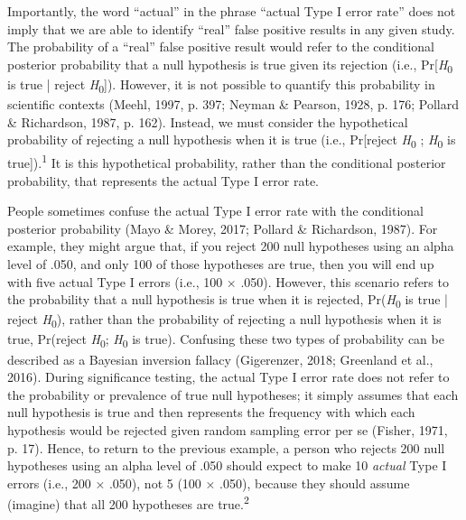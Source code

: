 \documentclass[authordate, empirical]{jote-new-article}
\begin{document}
	Importantly, the word “actual” in the phrase “actual Type I error rate” does not imply that we are able to identify “real” false positive results in any given study. The probability of a “real” false positive result would refer to the conditional posterior probability that a null hypothesis is true given its rejection (i.e., Pr[\emph{H}\textsubscript{0} is true | reject \emph{H}\textsubscript{0}]). However, it is not possible to quantify this probability in scientific contexts (Meehl, 1997, p. 397; Neyman \& Pearson, 1928, p. 176; Pollard \& Richardson, 1987, p. 162). Instead, we must consider the hypothetical probability of rejecting a null hypothesis when it is true (i.e., Pr[reject \emph{H}\textsubscript{0 }; \emph{H}\textsubscript{0} is true]).\textsuperscript{1 }It is this hypothetical probability, rather than the conditional posterior probability, that represents the actual Type I error rate.



	People sometimes confuse the actual Type I error rate with the conditional posterior probability (Mayo \& Morey, 2017; Pollard \& Richardson, 1987). For example, they might argue that, if you reject 200 null hypotheses using an alpha level of .050, and only 100 of those hypotheses are true, then you will end up with five actual Type I errors (i.e., 100 × .050). However, this scenario refers to the probability that a null hypothesis is true when it is rejected, Pr(\emph{H}\textsubscript{0} is true | reject \emph{H}\textsubscript{0}), rather than the probability of rejecting a null hypothesis when it is true, Pr(reject \emph{H}\textsubscript{0}; \emph{H}\textsubscript{0} is true). Confusing these two types of probability can be described as a Bayesian inversion fallacy (Gigerenzer, 2018; Greenland et al., 2016). During significance testing, the actual Type I error rate does not refer to the probability or prevalence of true null hypotheses; it simply assumes that each null hypothesis is true and then represents the frequency with which each hypothesis would be rejected given random sampling error per se (Fisher, 1971, p. 17). Hence, to return to the previous example, a person who rejects 200 null hypotheses using an alpha level of .050 should expect to make 10 \emph{actual} Type I errors (i.e., 200 × .050), not 5 (100 × .050), because they should assume (imagine) that all 200 hypotheses are true.\textsuperscript{2}
\end{document}
